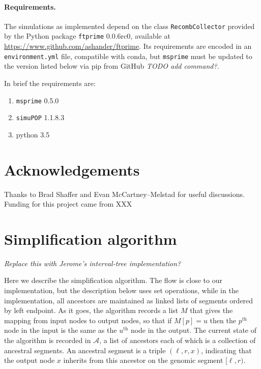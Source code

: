 \documentclass{article}
\newcommand{\simupop}{\texttt{simuPOP}}
\newcommand{\msprime}{\texttt{msprime}}
\newcommand{\ftprime}{\texttt{ftprime}}
\newcommand{\Al}{\mathcal{A}}  %
\newcommand{\plr}[1]{{\em \color{blue} #1}}
\newcommand{\jda}[1]{{\em \color{cyan} #1}}
\begin{document}
\paragraph{Requirements.}
The simulations as implemented depend on the class \texttt{RecombCollector} provided by
the Python package \ftprime{} 0.0.6rc0,
available at \url{https://www.github.com/ashander/ftprime}.
Its requirements are encoded in an \texttt{environment.yml} file, compatible
with conda, but \msprime{} must be updated to the version listed below via pip
from GitHub \jda{TODO add command?}.

In brief the requirements are:

\begin{enumerate}
    \item \msprime{} 0.5.0
    \item \simupop{} 1.1.8.3
    \item python 3.5
\end{enumerate}

\section*{Acknowledgements}
Thanks to Brad Shaffer and Evan McCartney--Melstad for useful discussions.
Funding for this project came from XXX




\appendix

\section{Simplification algorithm}
\label{ss:simplify_algorithm}

\plr{Replace this with Jerome's interval-tree implementation?}

Here we describe the simplification algorithm.
The flow is close to our implementation,
but the description below uses set operations,
while in the implementation,
all ancestors are maintained as linked lists of segments
ordered by left endpoint.
As it goes, the algorithm
records a list $M$ that gives the mapping
from input nodes to output nodes,
so that if $M[p] = u$ then the $p^\text{th}$ node in the input
is the same as the $u^\text{th}$ node in the output.
The current state of the algorithm is recorded in $\Al$,
a list of ancestors
each of which is a collection of ancestral segments.
An ancestral segment is a triple $(\ell, r, x)$,
indicating that the output node $x$ inherits from this ancestor
on the genomic segment $[\ell, r)$.
\end{document}
